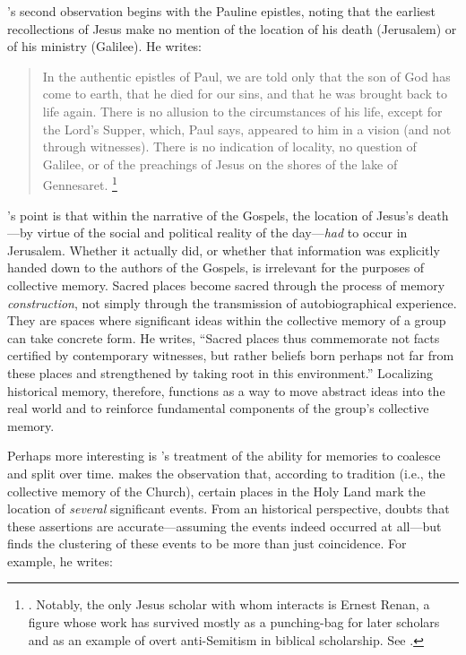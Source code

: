 \halbwachs's second observation begins with the Pauline epistles, noting that the earliest recollections of Jesus make no mention of the location of his death (Jerusalem) or of his ministry (Galilee). He writes:  

\begin{quote}
    In the authentic epistles of Paul, we are told only that the son of God has come to earth, that he died for our sins, and that he was brought back to life again. There is no allusion to the circumstances of his life, except for the Lord's Supper, which, Paul says, appeared to him in a vision (and not through witnesses). There is no indication of locality, no question of Galilee, or of the preachings of Jesus on the shores of the lake of Gennesaret.%
        \footnote{%
            \Cite[209]{halbwachs1992}.
            Notably, the only Jesus scholar with whom \halbwachs interacts is Ernest Renan, a figure whose work has survived mostly as a punching-bag for later scholars and as an example of overt anti-Semitism in biblical scholarship. See 
            \cite[39]{heschel2008}.}
\end{quote}  
\noindent
\halbwachs's point is that within the narrative of the Gospels, the location of Jesus's death---by virtue of the social and political reality of the day---\emph{had} to occur in Jerusalem.%
    \autocite[211]{halbwachs1992}
Whether it actually did, or whether that information was explicitly handed down to the authors of the Gospels, is irrelevant for the purposes of collective memory. Sacred places become sacred through the process of memory \emph{construction}, not simply through the transmission of autobiographical experience. They are spaces where significant ideas within the collective memory of a group can take concrete form. He writes, ``Sacred places thus commemorate not facts certified by contemporary witnesses, but rather beliefs born perhaps not far from these places and strengthened by taking root in this environment.''%
    \autocite[199]{halbwachs1992}
Localizing historical memory, therefore, functions as a way to move abstract ideas into the real world and to reinforce fundamental components of the group's collective memory.  

Perhaps more interesting is \halbwachs's treatment of the ability for memories to coalesce and split over time. \halbwachs makes the observation that, according to tradition (i.e., the collective memory of the Church), certain places in the Holy Land mark the location of \emph{several} significant events. From an historical perspective, \halbwachs doubts that these assertions are accurate---assuming the events indeed occurred at all---but finds the clustering of these events to be more than just coincidence. For example, he writes:  

